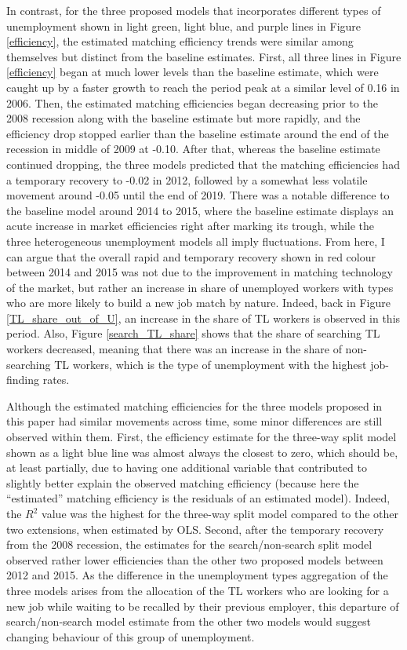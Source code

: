\documentclass[a4paper, 11pt, tikz]{article}
\begin{document}
In contrast, for the three proposed models that incorporates different types of unemployment shown in light green, light blue, and purple lines in Figure \ref{efficiency}, the estimated matching efficiency trends were similar among themselves but distinct from the baseline estimates.
First, all three lines in Figure \ref{efficiency} began at much lower levels than the baseline estimate, which were caught up by a faster growth to reach the period peak at a similar level of 0.16 in 2006.
Then, the estimated matching efficiencies began decreasing prior to the 2008 recession along with the baseline estimate but more rapidly, and the efficiency drop stopped earlier than the baseline estimate around the end of the recession in middle of 2009 at -0.10.
After that, whereas the baseline estimate continued dropping, the three models predicted that the matching efficiencies had a temporary recovery to -0.02 in 2012, followed by a somewhat less volatile movement around -0.05 until the end of 2019.
There was a notable difference to the baseline model around 2014 to 2015, where the baseline estimate displays an acute increase in market efficiencies right after marking its trough, while the three heterogeneous unemployment models all imply fluctuations.
From here, I can argue that the overall rapid and temporary recovery shown in red colour between 2014 and 2015 was not due to the improvement in matching technology of the market, but rather an increase in share of unemployed workers with types who are more likely to build a new job match by nature.
Indeed, back in Figure \ref{TL_share_out_of_U}, an increase in the share of TL workers is observed in this period.
Also, Figure \ref{search_TL_share} shows that the share of searching TL workers decreased, meaning that there was an increase in the share of non-searching TL workers, which is the type of unemployment with the highest job-finding rates.

Although the estimated matching efficiencies for the three models proposed in this paper had similar movements across time, some minor differences are still observed within them.
First, the efficiency estimate for the three-way split model shown as a light blue line was almost always the closest to zero, which should be, at least partially, due to having one additional variable that contributed to slightly better explain the observed matching efficiency (because here the ``estimated'' matching efficiency is the residuals of an estimated model).
Indeed, the $R^2$ value was the highest for the three-way split model compared to the other two extensions, when estimated by OLS.
Second, after the temporary recovery from the 2008 recession, the estimates for the search/non-search split model observed rather lower efficiencies than the other two proposed models between 2012 and 2015.
As the difference in the unemployment types aggregation of the three models arises from the allocation of the TL workers who are looking for a new job while waiting to be recalled by their previous employer, this departure of search/non-search model estimate from the other two models would suggest changing behaviour of this group of unemployment.
\end{document}
